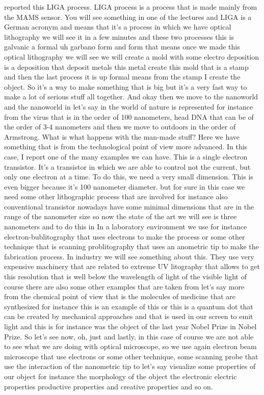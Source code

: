 reported this LIGA process. LIGA process is a process that is made mainly from the MAMS sensor. You will see something in one of the lectures and LIGA is a German acronym and means that it's a process in which we have optical lithography we will see it in a few minutes and these two processes this is galvanic a formal uh garbano form and form that means once we made this optical lithography we will see we will create a mold with some electro deposition is a deposition that deposit metals this metal create this mold that is a stamp and then the last process it is up formal means from the stamp I create the object. So it's a way to make something that is big but it's a very fast way to make a lot of serious stuff all together. And okay then we move to the nanoworld and the nanoworld in let's say in the world of nature is represented for instance from the virus that is in the order of 100 nanometers, head DNA that can be of the order of 3-4 nanometers and then we move to outdoors in the order of Armstrong. What is what happens with the man-made stuff? Here we have something that is from the technological point of view more advanced. In this case, I report one of the many examples we can have. This is a single electron transistor. It's a transistor in which we are able to control not the current, but only one electron at a time. To do this, we need a very small dimension. This is even bigger because it's 100 nanometer diameter. but for sure in this case we need some other lithographic process that are involved for instance also conventional transistor nowadays have some minimal dimensions that are in the range of the nanometer size so now the state of the art we will see is three nanometers and to do this in In a laboratory environment we use for instance electron-bublitography that uses electrons to make the process or some other technique that is scanning problitography that uses an anometric tip to make the fabrication process. In industry we will see something about this. They use very expensive machinery that are related to extreme UV litography that allows to get this resolution that is well below the wavelength of light of the visible light of course there are also some other examples that are taken from let's say more from the chemical point of view that is the molecules of medicine that are synthesized for instance this is an example of this or this is a quantum dot that can be created by mechanical approaches and that is used in our screen to emit light and this is for instance was the object of the last year Nobel Prize in Nobel Prize. So let's see now, oh, just and lastly, in this case of course we are not able to see what we are doing with optical microscope, so we use again electron beam microscope that use electrons or some other technique, some scanning probe that use the interaction of the nanometric tip to let's say visualize some properties of our object for instance the morphology of the object the electronic electric properties productive properties and creative properties and so on.
